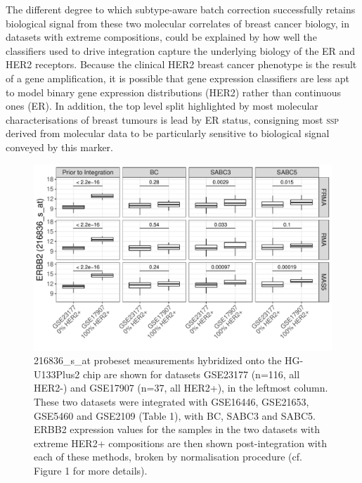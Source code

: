 \documentclass{article}\usepackage[]{graphicx}\usepackage[]{color}
\makeatletter
\def\maxwidth{ %
  \ifdim\Gin@nat@width>\linewidth
    \linewidth
  \else
    \Gin@nat@width
  \fi
}
\newenvironment{knitrout}{}{} %
\makeatother
\begin{document}
The different degree to which subtype-aware batch correction successfully
retains biological signal from these two molecular correlates of breast cancer
biology, in datasets with extreme compositions, could be explained by how well
the classifiers used to drive integration capture the underlying biology of the
ER and HER2 receptors.  Because the clinical HER2 breast cancer phenotype is the
result of a gene amplification, it is possible that gene expression classifiers
are less apt to model binary gene expression distributions (HER2) rather than
continuous ones (ER).  In addition, the top level split highlighted by most
molecular characterisations of breast tumours is lead by ER status, consigning
most \textsc{ssp} derived from molecular data to be particularly sensitive to
biological signal conveyed by this marker.

\begin{knitrout}
\color{fgcolor}\begin{figure}

{\centering \includegraphics[width=\maxwidth]{figure/her2-p2-extreme-datasets-by-her-status-1} 

}

\caption[216836\_s\_at probeset measurements hybridized onto the HG-U133Plus2 chip are shown for datasets GSE23177 (n=116, all HER2-) and GSE17907 (n=37, all HER2+), in the leftmost column]{216836\_s\_at probeset measurements hybridized onto the HG-U133Plus2 chip are shown for datasets GSE23177 (n=116, all HER2-) and GSE17907 (n=37, all HER2+), in the leftmost column.  These two datasets were integrated with GSE16446, GSE21653, GSE5460 and GSE2109 (Table 1), with BC, SABC3 and SABC5.  ERBB2 expression values for the samples in the two datasets with extreme HER2+ compositions are then shown post-integration with each of these methods, broken by normalisation procedure (cf. Figure 1 for more details).}\label{fig:her2-p2-extreme-datasets-by-her-status}
\end{figure}


\end{knitrout}
\end{document}

